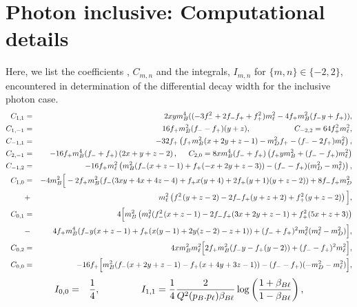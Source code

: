 \documentclass[a4paper,11pt]{article}
\begin{document}
		\section{ Photon inclusive: Computational details}
		\label{appc}
		Here, we list the coefficients , $C_{m,n}$ and the integrals, $I_{m,n}$ for $\{m,n\}\in \{-2,2\}$, encountered in determination of the differential decay width for the inclusive photon case.
			{\small
		 \begin{eqnarray}
		C_{1,1} &=& 2 x y m_{B}^{4}((-3 f_{-}^{2}+2 f_{-} f_{+}+f_{+}^{2}) m_{\ell}^{2}- 4 f_{+} m_{B}^{2}(f_{-} y + f_{+})),\nonumber\\
		C_{1,-1}&=& 16 f_{+} m_{B}^{2} (f_{-} - f_{+})(y+z), \hspace{2cm} C_{-2,2} = 64f_{+}^{2} m_{\ell}^{2},\nonumber\\
			C_{-1,1}&=&- 32 f_{+} \left(f_{+}m_{B}^{2}(x+2y+z-1)-m_{D}^{2}f_{+}-(f_{-}-2f_{+}) m_{\ell}^{2} \right),\nonumber\\
		C_{2,-1}&=& -16 f_{+} m_{B}^{4} (f_{-}+f_{+})\left(2x+y+z-2\right),\hspace{0.5cm}	C_{2,0} = 8xm_{B}^{4}(f_{-}+f_{+}) \left(f_{+}ym_{B}^{2}+(f_{-}-f_{+})m_{\ell}^{2}\right)\nonumber\\
		C_{-1,2} &=& -16 f_{+} m_{\ell}^{2}\left(m_{B}^{2}(f_{-}(x+z-1)+f_{+}(-x+2y+z-3))-(f_{-}-f_{+})(m_{D}^{2}-m_{\ell}^{2}) \right), \nonumber\\
			C_{1,0} &=& - 4 m_{B}^{2} \Big[-2f_{+}m_{B}^{2}(f_{-}(3xy+4x+4z-4)+f_{+} x(y+4)+ 2f_{+}(y+1)(y+z-2)) +8f_{-}f_{+} m_{D}^{2}  \nonumber\\
		&+&m_{\ell}^{2}\left( f_{-}^{2}(y+z-2)-2f_{-}f_{+}(y+z+2)+ f_{+}^{2}(y+z-2)\right)
	\Big],\nonumber\\
		C_{0,1}&=& 4\Big[m_{B}^{2}\left(m_{\ell}^{2}(f_{-}^{2}(x+z-1)-2f_{-} f_{+} (3x + 2y + z - 1)+ f_{+}^{2}(5x+z+3)\right)\nonumber\\&-&4 f_{+}m_{B}^{4}(f_{-} y (x+z-1) + f_{+} (x(y-1)+2y(z-2)-z+1))+  (f_{-}+f_{+})^{2}m_{\ell}^{2}(m_{\ell}^{2}-m_{D}^{2}) \Big],\nonumber\\
		C_{0,2} &=& 4 x m_{B}^{2} m_{\ell}^{2} \Big[2f_{+}m_{B}^{2}(f_{-} y - f_{+}(y-2)) +(f_{-}-f_{+})^{2} m_{\ell}^{2}\Big],\nonumber\\
		C_{0,0} &=& -16f_{+} \Big[ m_{B}^{2}(f_{-}(x+2y+z-1) -f_{+}(x+4y+3z-1)) - (f_{-}-f_{+}) (-m_{D}^{2}-m_{\ell}^{2})\Big],	\nonumber     
		\end{eqnarray}
		{\small
		\begin{eqnarray}
		I_{0,0} &=& \frac{1}{4},\hspace{1.5cm} I_{1,1}= \frac{1}{4} \frac{2}{Q^{2}(p_{B}.p_{\ell}) \beta_{B \ell}}\log\left(\frac{1+\beta_{B \ell}}{1-\beta_{B \ell}}\right),\nonumber\\

\end{eqnarray}}}
\end{document}
